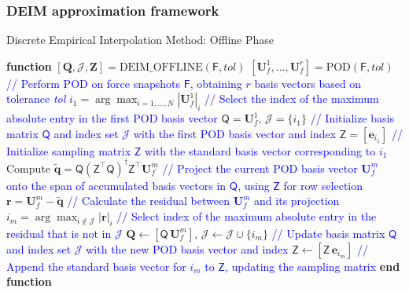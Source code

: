 \documentclass[11pt]{article}
\renewcommand{\vec}[1]{\mathbf{#1}}
\newcommand{\mat}[1]{\mathsf{#1}}
\begin{document}
        \subsubsection*{DEIM approximation framework}
        \begin{algorithm}[t]
            \caption{Discrete Empirical Interpolation Method: Offline Phase \cite{Hesthaven2016,chaturantabut2010nonlinear}}
            \begin{algorithmic}[1]
                \STATE \textbf{function} $[\mathbf{Q}, \mathcal{J}, \mathbf{Z}] = \text{DEIM\_OFFLINE}(\mat{F}, tol)$
                \STATE $[\vec{U}_f^1, \dots, \vec{U}_f^r] = \text{POD}(\mat{F}, tol)$ \textcolor{blue}{// Perform POD on force snapshots $\mat{F}$, obtaining $r$ basis vectors based on tolerance \textit{tol}}
                \STATE $i_1 = \arg\max_{i=1,\dots,N} |\vec{U}_f^1|_i$ \textcolor{blue}{// Select the index of the maximum absolute entry in the first POD basis vector}
                \STATE $\mat{Q} = \vec{U}_f^1$, $\mathcal{J} = \{ i_1 \}$ \textcolor{blue}{// Initialize basis matrix $\mat{Q}$ and index set $\mathcal{J}$ with the first POD basis vector and index}
                \STATE $\mat{Z} = [\vec{e}_{i_1}]$ \textcolor{blue}{// Initialize sampling matrix $\mat{Z}$ with the standard basis vector corresponding to $i_1$}
                    \STATE Compute $\mathbf{\tilde{q}} = \mat{Q} (\mat{Z}^\top \mat{Q})^{\dagger} \mat{Z}^\top \vec{U}_f^m$ \textcolor{blue}{// Project the current POD basis vector $\vec{U}_f^m$ onto the span of accumulated basis vectors in $\mat{Q}$, using $\mat{Z}$ for row selection}
                    \STATE $\mathbf{r} = \vec{U}_f^m - \mathbf{\tilde{q}}$ \textcolor{blue}{// Calculate the residual between $\vec{U}_f^m$ and its projection}
                    \STATE $i_m = \arg\max_{i \notin \mathcal{J}} |\mathbf{r}|_i$ \textcolor{blue}{// Select index of the maximum absolute entry in the residual that is not in $\mathcal{J}$}
                    \STATE $\mathbf{Q} \leftarrow [\mat{Q} \, \vec{U}_f^m]$, $\mathcal{J} \leftarrow \mathcal{J} \cup \{ i_m \}$ \textcolor{blue}{// Update basis matrix $\mat{Q}$ and index set $\mathcal{J}$ with the new POD basis vector and index}
                    \STATE $\mat{Z} \leftarrow [\mat{Z} \, \vec{e}_{i_m}]$ \textcolor{blue}{// Append the standard basis vector for $i_m$ to $\mat{Z}$, updating the sampling matrix}
                \ENDFOR
                \STATE \textbf{end function}
            \end{algorithmic}
            \label{alg:DEIM_offline}
        \end{algorithm}
\end{document}
